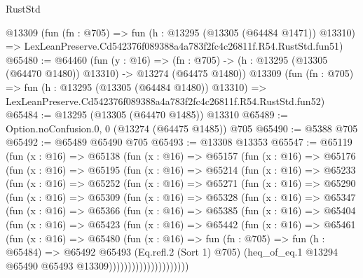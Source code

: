 \begin{lexlean}{RustStd}
\begin{coremodule}
    @13309
    (fun (fn : @705) =>
    fun (h : @13295 (@13305 (@64484 @1471)) @13310) =>
    LexLeanPreserve.Cd542376f089388a4a783f2fc4c26811f.R54.RustStd.fun51)
@65480 := @64460
    (fun (y : @16) =>
    (fn : @705) -> (h : @13295 (@13305 (@64470 @1480)) @13310) -> @13274 (@64475 @1480))
    @13309
    (fun (fn : @705) =>
    fun (h : @13295 (@13305 (@64484 @1480)) @13310) =>
    LexLeanPreserve.Cd542376f089388a4a783f2fc4c26811f.R54.RustStd.fun52)
@65484 := @13295 (@13305 (@64470 @1485)) @13310
@65489 := Option.noConfusion.{0, 0} (@13274 (@64475 @1485)) @705
@65490 := @5388 @705
@65492 := @65489 @65490 @705
@65493 := @13308 @13353
@65547 := @65119
    (fun (x : @16) =>
    @65138
      (fun (x : @16) =>
      @65157
        (fun (x : @16) =>
        @65176
          (fun (x : @16) =>
          @65195
            (fun (x : @16) =>
            @65214
              (fun (x : @16) =>
              @65233
                (fun (x : @16) =>
                @65252
                  (fun (x : @16) =>
                  @65271
                    (fun (x : @16) =>
                    @65290
                      (fun (x : @16) =>
                      @65309
                        (fun (x : @16) =>
                        @65328
                          (fun (x : @16) =>
                          @65347
                            (fun (x : @16) =>
                            @65366
                              (fun (x : @16) =>
                              @65385
                                (fun (x : @16) =>
                                @65404
                                  (fun (x : @16) =>
                                  @65423
                                    (fun (x : @16) =>
                                    @65442
                                      (fun (x : @16) =>
                                      @65461
                                        (fun (x : @16) =>
                                        @65480
                                          (fun (x : @16) =>
                                          fun (fn : @705) =>
                                          fun (h : @65484) =>
                                          @65492
                                            @65493
                                            (Eq.refl.{2} (Sort 1) @705)
                                            (heq_of_eq.{1}
                                              @13294
                                              @65490
                                              @65493
                                              @13309)))))))))))))))))))))

\end{coremodule}
\end{lexlean}
